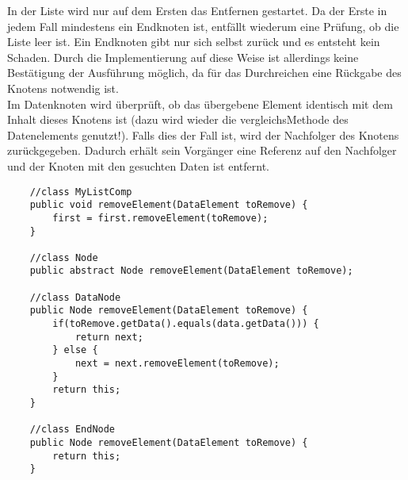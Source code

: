 \documentclass{article}
\begin{document}
In der Liste wird nur auf dem Ersten das Entfernen gestartet. Da der Erste in jedem Fall mindestens ein Endknoten ist, entfällt wiederum eine Prüfung, ob die Liste leer ist. Ein Endknoten gibt nur sich selbst zurück und es entsteht kein Schaden. Durch die Implementierung auf diese Weise ist allerdings keine Bestätigung der Ausführung möglich, da für das  Durchreichen eine Rückgabe des Knotens notwendig ist. \\
Im Datenknoten wird überprüft, ob das übergebene Element identisch mit dem Inhalt dieses Knotens ist (dazu wird wieder die vergleichsMethode des Datenelements genutzt!). Falls dies der Fall ist, wird der Nachfolger des Knotens zurückgegeben. Dadurch erhält sein Vorgänger eine Referenz auf den Nachfolger und der Knoten mit den gesuchten Daten ist entfernt. 
\begin{verbatim}
    //class MyListComp 
    public void removeElement(DataElement toRemove) {
        first = first.removeElement(toRemove);
    }

    //class Node 
    public abstract Node removeElement(DataElement toRemove);

    //class DataNode 
    public Node removeElement(DataElement toRemove) {
        if(toRemove.getData().equals(data.getData())) {
            return next;
        } else {
            next = next.removeElement(toRemove);
        }
        return this;
    }

    //class EndNode 
    public Node removeElement(DataElement toRemove) {
        return this;
    }
\end{verbatim}
\end{document}
